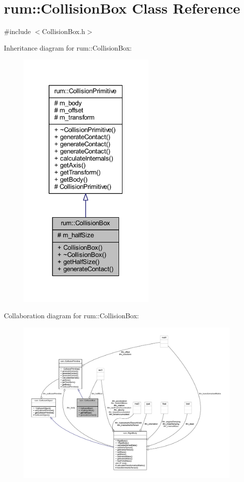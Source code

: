 \hypertarget{classrum_1_1_collision_box}{}\section{rum\+:\+:Collision\+Box Class Reference}
\label{classrum_1_1_collision_box}


{\ttfamily \#include $<$Collision\+Box.\+h$>$}



Inheritance diagram for rum\+:\+:Collision\+Box\+:\nopagebreak
\begin{figure}[H]
\begin{center}
\leavevmode
\includegraphics[width=193pt]{classrum_1_1_collision_box__inherit__graph}
\end{center}
\end{figure}


Collaboration diagram for rum\+:\+:Collision\+Box\+:\nopagebreak
\begin{figure}[H]
\begin{center}
\leavevmode
\includegraphics[width=350pt]{classrum_1_1_collision_box__coll__graph}
\end{center}
\end{figure}
